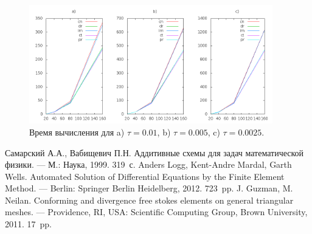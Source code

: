 \documentclass[12pt]{article}
\begin{document}
\begin{figure}
	\begin{center}
		\includegraphics[width=400px]{data160/scheme-time}
		\caption{Время вычисления для a) $\tau=0.01$, b) $\tau=0.005$, c) $\tau=0.0025$.}
		\label{fg:scheme-time}
	\end{center}
\end{figure}

\begin{thebibliography}{9}
 Самарский А.А., Вабищевич П.Н. Аддитивные схемы для задач математической физики. \newblock --- М.: Наука, 1999. 319~с.
 Anders Logg, Kent-Andre Mardal, Garth Wells. Automated Solution of Differential Equations by the Finite Element Method. \newblock --- Berlin: Springer Berlin Heidelberg, 2012. 723~pp.
 J. Guzman, M. Neilan. Conforming and divergence free stokes elements on general triangular meshes. \newblock --- Providence, RI, USA: Scientific Computing Group, Brown University, 2011. 17~pp.


\end{thebibliography}
\end{document}
